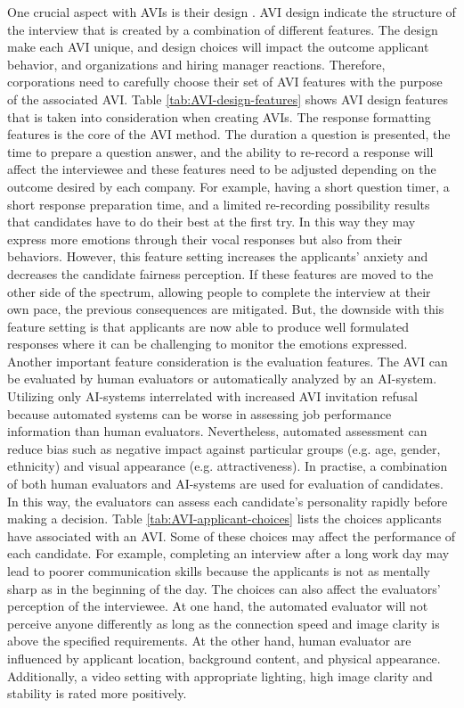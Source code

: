 One crucial aspect with AVIs is their design \cite{video-interview1-LUKACIK2022100789}. AVI design indicate the structure of the interview that is created by a combination of different features. The design make each AVI unique, and design choices will impact the outcome applicant behavior, and organizations and hiring manager reactions. Therefore, corporations need to carefully choose their set of AVI features with the purpose of the associated AVI. Table \ref{tab:AVI-design-features} shows AVI design features that is taken into consideration when creating AVIs. The response formatting features is the core of the AVI method. The duration a question is presented, the time to prepare a question answer, and the ability to re-record a response will affect the interviewee and these features need to be adjusted depending on the outcome desired by each company. For example, having a short question timer, a short response preparation time, and a limited re-recording possibility results that candidates have to do their best at the first try. In this way they may express more emotions through their vocal responses but also from their behaviors. However, this feature setting increases the applicants' anxiety and decreases the candidate fairness perception. If these features are moved to the other side of the spectrum, allowing people to complete the interview at their own pace, the previous consequences are mitigated. But, the downside with this feature setting is that applicants are now able to produce well formulated responses where it can be challenging to monitor the emotions expressed. Another important feature consideration is the evaluation features. The AVI can be evaluated by human evaluators or automatically analyzed by an AI-system. Utilizing only AI-systems interrelated with increased AVI invitation refusal because automated systems can be worse in assessing job performance information than human evaluators. Nevertheless, automated assessment can reduce bias such as negative impact against particular groups (e.g. age, gender, ethnicity) and visual appearance (e.g. attractiveness). In practise, a combination of both human evaluators and AI-systems are used for evaluation of candidates. In this way, the evaluators can assess each candidate's personality rapidly before making a decision. Table \ref{tab:AVI-applicant-choices} lists the choices applicants have associated with an AVI. Some of these choices may affect the performance of each candidate. For example, completing an interview after a long work day may lead to poorer communication skills because the applicants is not as mentally sharp as in the beginning of the day. The choices can also affect the evaluators' perception of the interviewee. At one hand, the automated evaluator will not perceive anyone differently as long as the connection speed and image clarity is above the specified requirements. At the other hand, human evaluator are influenced by applicant location, background content, and physical appearance. Additionally, a video setting with appropriate lighting, high image clarity and stability is rated more positively. 
